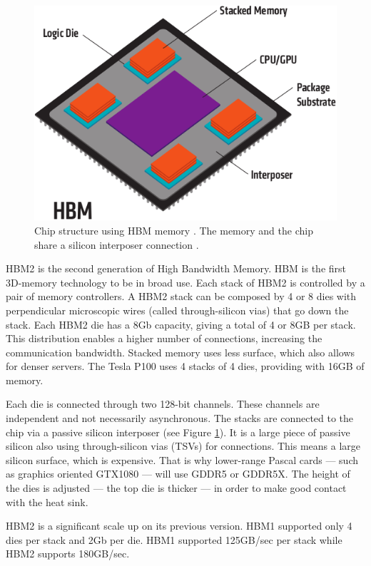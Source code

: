 \begin{figure}[ht!]
    \centering
    \includegraphics[width=\linewidth]{hbm}
    \caption{Chip structure using HBM memory \cite{amd:hbm}. The memory and the chip share a silicon interposer connection \cite{amkor:hbmwhitepaper}.}
    \label{fig:hbm}
\end{figure}
HBM2 is the second generation of High Bandwidth Memory.
HBM is the first 3D-memory technology to be in broad use.
Each stack of HBM2 is controlled by a pair of memory controllers.
A HBM2 stack can be composed by 4 or 8 dies with perpendicular microscopic wires (called through-silicon vias) that go down the stack.
Each HBM2 die has a 8Gb capacity, giving a total of 4 or 8GB per stack.
This distribution enables a higher number of connections, increasing the communication bandwidth.
Stacked memory uses less surface, which also allows for denser servers.
The Tesla P100 uses 4 stacks of 4 dies, providing with 16GB of memory.

Each die is connected through two 128-bit channels.
These channels are independent and not necessarily asynchronous.
The stacks are connected to the chip via a passive silicon interposer (see Figure \ref{fig:hbm}).
It is a large piece of passive silicon also using through-silicon vias (TSVs) for connections.
This means a large silicon surface, which is expensive.
That is why lower-range Pascal cards --- such as graphics oriented GTX1080 --- will use GDDR5 or GDDR5X.
The height of the dies is adjusted --- the top die is thicker --- in order to make good contact with the heat sink.

HBM2 is a significant scale up on its previous version.
HBM1 supported only 4 dies per stack and 2Gb per die.
HBM1 supported 125GB/sec per stack while HBM2 supports 180GB/sec.

